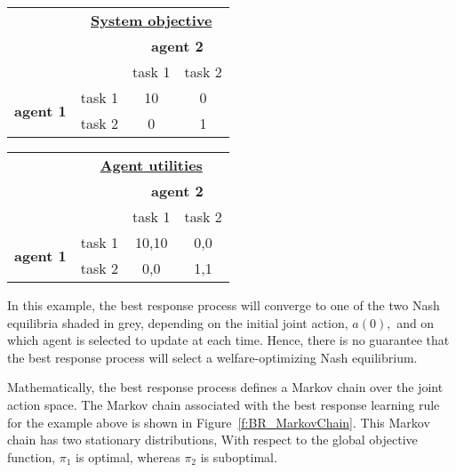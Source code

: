 \begin{center}
\begin{tabular}{rr|c|c|}
\multicolumn{1}{c}{}&\multicolumn{3}{c}{\textbf{\underline{System objective}}}\\
\multicolumn{2}{r}{}&\multicolumn{2}{c}{\textbf{agent 2}}\\
\multicolumn{2}{r}{}
 &  \multicolumn{1}{c}{task 1}
 & \multicolumn{1}{c}{task 2} \\
\cline{3-4}
\multirow{2}{*}{\textbf{agent 1}}
&task 1 & 10 & 0 \\
\cline{3-4}
&task 2 & 0 & 1 \\
\cline{3-4}
\end{tabular}\quad\quad\quad
\begin{tabular}{rr|c|c|}
\multicolumn{1}{c}{}&\multicolumn{3}{c}{\textbf{\underline{Agent utilities}}}\\
\multicolumn{2}{r}{}&\multicolumn{2}{c}{\textbf{agent 2}}\\
\multicolumn{2}{r}{}
 &  \multicolumn{1}{c}{task 1}
 & \multicolumn{1}{c}{task 2} \\
\cline{3-4}
\multirow{2}{*}{\textbf{agent 1}}
&task 1 & \cellcolor[gray]{0.8}10,10 & 0,0 \\
\cline{3-4}
&task 2 & 0,0 & \cellcolor[gray]{0.8}1,1 \\
\cline{3-4}
\end{tabular}
\end{center}
\medskip

In this example, the best response process will converge to one of the two Nash equilibria shaded in grey, depending on the initial joint action, $a(0),$ and on which agent is selected to update at each time. Hence, there is no guarantee that the best response process will select a welfare-optimizing Nash equilibrium.

Mathematically, the best response process defines a Markov chain over the joint action space. The Markov chain associated with the best response learning rule for the example above is shown in Figure~\ref{f:BR_MarkovChain}. This Markov chain has two stationary distributions,
With respect to the global objective function, $\pi_1$ is optimal, whereas $\pi_2$ is suboptimal. 

